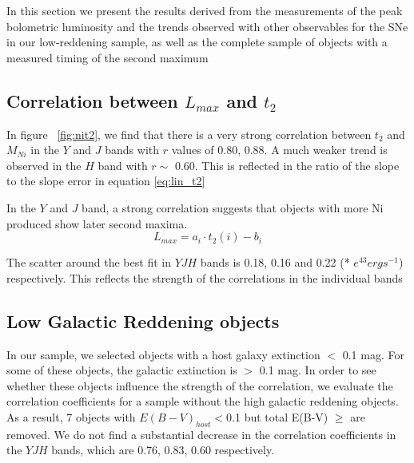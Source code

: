 In this section we present the results derived from the measurements of the peak bolometric luminosity and the trends observed with other observables for the SNe in our low-reddening sample, as well as the complete sample of objects with a measured timing of the second maximum



\subsection{Correlation between $L_{max}$ and $t_2$ }

In figure ~\ref{fig:nit2}, we find that there is a very strong correlation between $t_2$ and $M_{Ni}$ in the $Y$ and $J$ bands with $r$ values of 
0.80, 0.88. A much weaker trend is observed in the $H$ band with $r \sim$ 0.60. This is reflected in the ratio of the slope to the slope error in equation \eqref{eq:lin_t2}

In the $Y$ and $J$ band, a strong correlation suggests that objects with more Ni produced show later second maxima. 
\begin{equation}
\label{eq:lin_t2}
L_{max}=a_i \cdot t_2(i) - b_i
\end{equation}
\iffalse
\begin{subequations}

\begin{equation}
\label{eq:y}
L_{Max}=0.040(\pm 0.005) * t_2(Y) - 0.055 (\pm 0.125)
\end{equation}
\begin{equation}
\label{eq:j}
L_{Max}=0.042(\pm 0.004) * t_2(J) - 0.039 (\pm 0.102)
\end{equation}
\begin{equation}
\label{eq:j}
L_{Max}=0.033(\pm 0.009) * t_2(H) - 0.239 (\pm 0.203)
\end{equation}
\end{subequations}
\fi
The scatter around the best fit in $YJH$ bands is 0.18, 0.16 and 0.22 (* $e^{43} erg s ^{-1}$) respectively. This reflects the strength of the correlations in the individual bands

\subsection{Low Galactic Reddening objects}
In our sample, we selected objects with a host galaxy extinction $<$ 0.1 mag. For some of these objects, the galactic extinction is $>$ 0.1 mag. In order to see whether these objects influence the strength of the correlation, we evaluate the correlation coefficients for a sample without the high galactic reddening objects.
 As a result, 7 objects with $E(B-V)_{host}<$0.1 but total E(B-V) $\geq$ are removed. We do not find a substantial decrease in the correlation coefficients in the $YJH$ bands, which are 0.76, 0.83, 0.60 respectively. 
 
